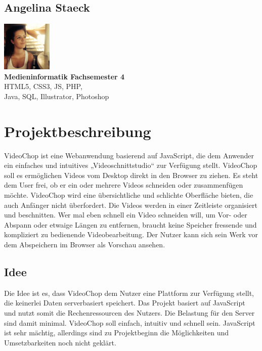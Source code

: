 \documentclass[a4paper,10pt]{scrartcl}
\begin{document}
\subsection{Angelina Staeck}
\begin{center}
\includegraphics[height=90px, width=90px]{images/angi.jpg}\\
\textbf{Medieninformatik Fachsemester 4} \\
\vspace*{1.5mm} 
HTML5, CSS3, JS, PHP, \\
Java, SQL, Illustrator, Photoshop
\end{center}
\newpage
\section{Projektbeschreibung}
VideoChop ist eine Webanwendung basierend auf JavaScript, die dem Anwender  ein einfaches und intuitives „Videoschnittstudio“ zur Verfügung stellt. VideoChop soll es ermöglichen Videos vom Desktop direkt in den Browser zu ziehen. Es steht dem User frei, ob er ein oder mehrere Videos schneiden oder zusammenfügen möchte. VideoChop wird eine übersichtliche und schlichte Oberfläche bieten, die auch Anfänger nicht überfordert. Die Videos werden in einer Zeitleiste organisiert und beschnitten. Wer mal eben schnell ein Video schneiden will, um Vor- oder Abspann oder etwaige Längen zu entfernen, braucht keine Speicher fressende und kompliziert zu bedienende Videobearbeitung. Der Nutzer kann sich sein Werk vor dem Abspeichern im Browser als Vorschau ansehen.
\subsection{Idee}
Die Idee ist es, dass VideoChop dem Nutzer eine Plattform zur Verfügung stellt, die keinerlei Daten serverbasiert speichert. Das Projekt basiert auf JavaScript und nutzt somit die Rechenressourcen des Nutzers. Die Belastung für den Server sind damit minimal. VideoChop soll einfach, intuitiv und schnell sein. JavaScript ist sehr mächtig, allerdings sind zu Projektbeginn die Möglichkeiten und Umsetzbarkeiten noch nicht geklärt.
\end{document}
